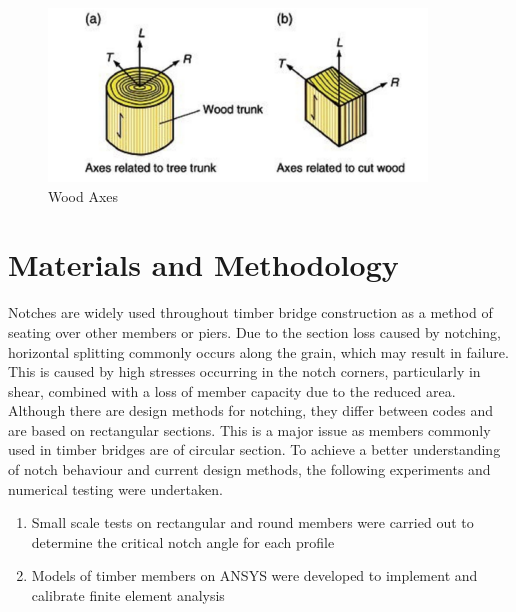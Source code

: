 \documentclass[11pt,a4paper]{article}
\numberwithin{equation}{subsection}
\begin{document}
\begin{figure}[h]
	\begin{center}
		\includegraphics[scale=0.9]{Wood_Axes}
	\end{center}
 	\caption{Wood Axes \cite{porteous_structural_2013}}
 	\label{fig:Axes}
\end{figure}

\vspace*{\baselineskip}
\pagebreak

\section{Materials and Methodology}
Notches are widely used throughout timber bridge construction as a method of seating over other members or piers. Due to the section loss caused by notching, horizontal splitting commonly occurs along the grain, which may result in failure. This is caused by high stresses occurring in the notch corners, particularly in shear, combined with a loss of member capacity due to the reduced area. Although there are design methods for notching, they differ between codes and are based on rectangular sections. This is a major issue as members commonly used in timber bridges are of circular section. To achieve a better understanding of notch behaviour and current design methods, the following experiments and numerical testing were undertaken. 

	\begin{enumerate}
		\item Small scale tests on rectangular and round members were carried out to determine the critical notch angle for each profile
		\item Models of timber members on ANSYS were developed to implement and calibrate finite element analysis 
	\end{enumerate}
\end{document}
